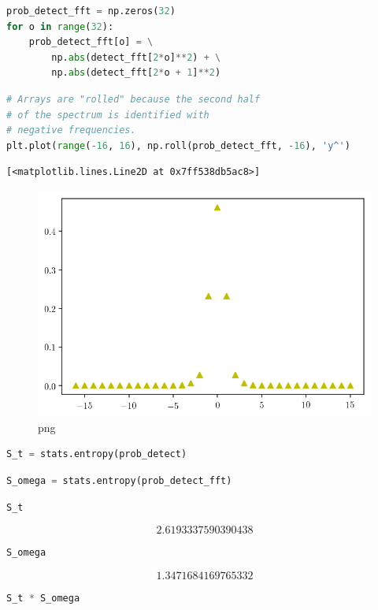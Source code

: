 \begin{lstlisting}[language=Python]
prob_detect_fft = np.zeros(32)
for o in range(32):
    prob_detect_fft[o] = \
        np.abs(detect_fft[2*o]**2) + \
        np.abs(detect_fft[2*o + 1]**2) 
\end{lstlisting}

\begin{lstlisting}[language=Python]
# Arrays are "rolled" because the second half 
# of the spectrum is identified with
# negative frequencies.
plt.plot(range(-16, 16), np.roll(prob_detect_fft, -16), 'y^')
\end{lstlisting}

\begin{lstlisting}
[<matplotlib.lines.Line2D at 0x7ff538db5ac8>]
\end{lstlisting}

\begin{figure}
\centering
\includegraphics[width=0.6\linewidth]{output_102_1.png}
\caption{png}
\end{figure}

\begin{lstlisting}[language=Python]
S_t = stats.entropy(prob_detect)
\end{lstlisting}

\begin{lstlisting}[language=Python]
S_omega = stats.entropy(prob_detect_fft)
\end{lstlisting}

\begin{lstlisting}[language=Python]
S_t
\end{lstlisting}

\[2.6193337590390438\]

\begin{lstlisting}[language=Python]
S_omega
\end{lstlisting}

\[1.3471684169765332\]

\begin{lstlisting}[language=Python]
S_t * S_omega
\end{lstlisting}

